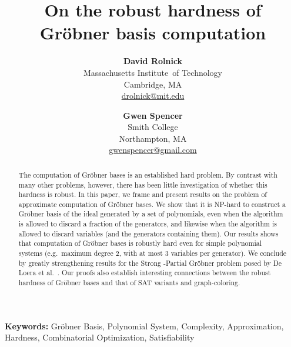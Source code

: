 \documentclass{article}
\begin{document}
\title{\textbf{On the robust hardness of \\
Gr\"{o}bner basis computation}}







\author{
\textbf{David Rolnick}\\
       Massachusetts Institute~of Technology\\
       Cambridge, MA\\
       \url{drolnick@mit.edu}\\
\and
\textbf{Gwen Spencer}\\
       Smith College\\
       Northampton, MA\\
       \url{gwenspencer@gmail.com}
}
\date{}

\maketitle
\begin{abstract}
The computation of Gr\"obner bases is an established hard problem. By contrast with many other problems, however, there has been little investigation of whether this hardness is robust.  In this paper, we frame and present results on the problem of approximate computation of Gr\"obner bases. We show that it is NP-hard to construct a Gr\"obner basis of the ideal generated by a set of polynomials, even when the algorithm is allowed to discard a  fraction of the generators, and likewise when the algorithm is allowed to discard variables (and the generators containing them). Our results shows that computation of Gr\"obner bases is robustly hard even for simple polynomial systems (e.g.~maximum degree 2, with at most 3 variables per generator). We conclude by greatly strengthening results for the Strong \nobreakdash-Partial Gr\"obner problem posed by De Loera et al.~\cite{deloera}. Our proofs also establish interesting connections between the robust hardness of Gr\"obner bases and that of SAT variants and graph-coloring.
\end{abstract}









\noindent\textbf{Keywords:} Gr\"{o}bner Basis, Polynomial System, Complexity, Approximation, Hardness, Combinatorial Optimization, Satisfiability\\
\end{document}
